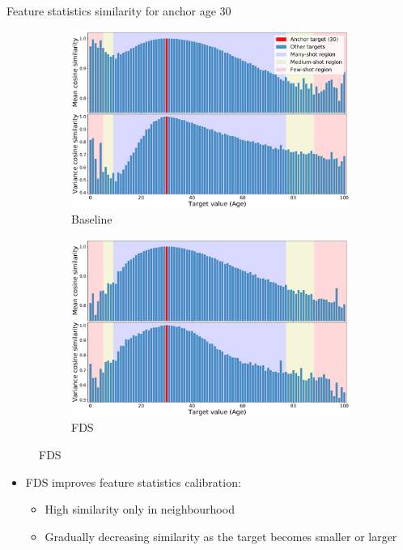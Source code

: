 \begin{frame}{Feature statistics similarity for anchor age 30}
	\begin{figure}[h]
		\begin{subfigure}{0.48\textwidth}
			\includegraphics[width=\linewidth]{images/feat_sim_fds_base_30.pdf}
			\caption{Baseline}
		\end{subfigure}\hspace{1em}%
		\begin{subfigure}{0.48\textwidth}
			\includegraphics[width=\linewidth]{images/feat_sim_fds_ours_30.pdf}
			\caption{FDS}
		\end{subfigure}
	\end{figure}
	\begin{itemize}
		\item FDS improves feature statistics calibration:
		\begin{itemize}
			\item High similarity only in neighbourhood
			\item Gradually decreasing similarity as the target becomes smaller or larger
		\end{itemize}
	\end{itemize}
\end{frame}

